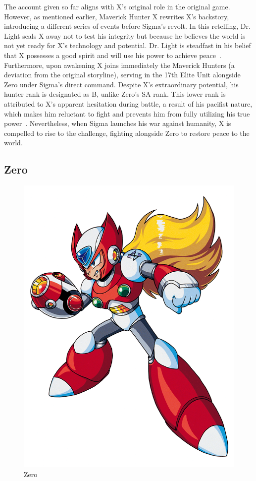 The account given so far aligns with X's original role in the original game. However, as mentioned earlier, Maverick Hunter X rewrites X's backstory, introducing a different series of events before Sigma's revolt. In this retelling, Dr. Light seals X away not to test his integrity but because he believes the world is not yet ready for X's technology and potential. Dr. Light is steadfast in his belief that X possesses a good spirit and will use his power to achieve peace~\cite{wiki:MM_MHX_X}. Furthermore, upon awakening X joins immediately the Maverick Hunters (a deviation from the original storyline), serving in the 17th Elite Unit alongside Zero under Sigma's direct command. Despite X's extraordinary potential, his hunter rank is designated as B, unlike Zero's SA rank. This lower rank is attributed to X's apparent hesitation during battle, a result of his pacifist nature, which makes him reluctant to fight and prevents him from fully utilizing his true power~\cite{Xcoll1:Manual_X1}. Nevertheless, when Sigma launches his war against humanity, X is compelled to rise to the challenge, fighting alongside Zero to restore peace to the world.

\subsection{Zero}
\begin{figure}[htp]
	\centering
	\includegraphics[height=\portraitsize]{figures/X1/Zero_X1.png}
	\caption{Zero}
\end{figure}

